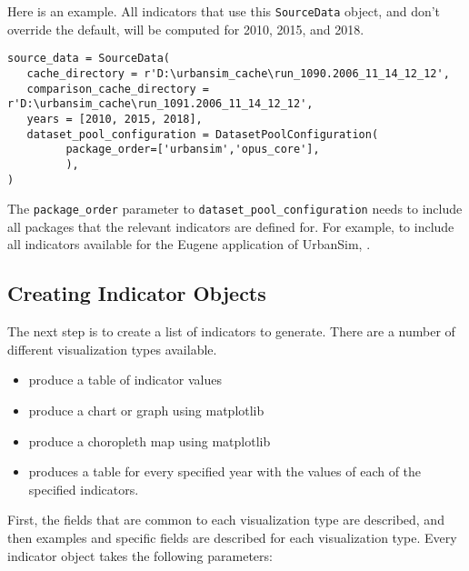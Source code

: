 Here is an example. All indicators that use this \verb|SourceData| object, and don't
override the default, will be computed for 2010, 2015, and 2018. 

\begin{verbatim}
source_data = SourceData(
   cache_directory = r'D:\urbansim_cache\run_1090.2006_11_14_12_12',
   comparison_cache_directory = r'D:\urbansim_cache\run_1091.2006_11_14_12_12',
   years = [2010, 2015, 2018],
   dataset_pool_configuration = DatasetPoolConfiguration(
         package_order=['urbansim','opus_core'],
         ),                  
)
\end{verbatim}

The \verb|package_order| parameter to \verb|dataset_pool_configuration| needs to
include all packages that the relevant indicators are defined for. For example,
to include all indicators available for the Eugene application of UrbanSim,
.

\subsection{Creating Indicator Objects}

The next step is to create a list of indicators to generate. There are a 
number of different visualization types available. 

\begin{itemize}
\tight
\item {}  produce a table  of indicator \indicatorsindex values
\item {}  produce a chart  or graph  using matplotlib \matplotlibindex
\item {}  produce a choropleth map  using matplotlib \matplotlibindex
\item {} produces a table for every specified year 
with the values of each of the specified indicators.
\end{itemize}

First, the fields 
that are common to each visualization type are described, and then examples and
specific fields are described for each visualization type. Every indicator 
object takes the following parameters:

